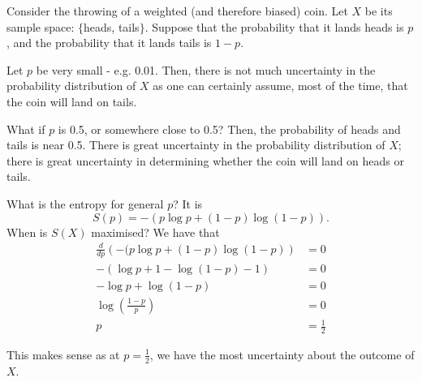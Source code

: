 \documentclass[a4paper, 12pt,oneside,openany]{book}
\begin{document}
Consider the throwing of a weighted (and therefore biased) coin. Let $X$ be its sample space: $\{$heads, tails$\}$. Suppose that the probability that it lands heads is $p$, and the probability that it lands tails is $1-p$. 

Let $p$ be very small - e.g. 0.01. Then, there is not much uncertainty in the probability distribution of $X$ as one can certainly assume, most of the time, that the coin will land on tails. 

What if $p$ is 0.5, or somewhere close to 0.5? Then, the probability of heads and tails is near 0.5. There is great uncertainty in the probability distribution of $X$; there is great uncertainty in determining whether the coin will land on heads or tails.



What is the entropy for general $p$? It is $$S(p) = -(p\log p + (1-p) \log(1-p)).$$ When is $S(X)$ maximised? We have that \begin{align*} \frac{d}{dp} \left(-(p\log p + (1-p) \log(1-p) \right)&= 0 \\ -(\log p + 1 - \log(1-p)-1) &= 0 \\  -\log p + \log(1-p) &= 0 \\ \log\left(\frac{1-p}{p}\right)&=0 \\ p&=\frac{1}{2} \end{align*}

This makes sense as at $p=\frac{1}{2}$, we have the most uncertainty about the outcome of $X$.
\end{document}
